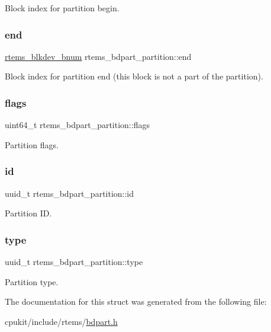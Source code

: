 Block index for partition begin. \mbox{\label{structrtems__bdpart__partition_ad30ffdd94a2d559e14aaf93b1a116ffd}} 
\subsubsection{\texorpdfstring{end}{end}}
{\footnotesize\ttfamily \mbox{\hyperlink{group__rtems__disk_ga5fbcfd40b657bff6c54d9e393fab3274}{rtems\+\_\+blkdev\+\_\+bnum}} rtems\+\_\+bdpart\+\_\+partition\+::end}

Block index for partition end (this block is not a part of the partition). \mbox{\label{structrtems__bdpart__partition_a820a70ab5b27cdc40496cd1df1346b83}} 
\subsubsection{\texorpdfstring{flags}{flags}}
{\footnotesize\ttfamily uint64\+\_\+t rtems\+\_\+bdpart\+\_\+partition\+::flags}

Partition flags. \mbox{\label{structrtems__bdpart__partition_ab05630a2edb3ac05876dc2c1845bed3b}} 
\subsubsection{\texorpdfstring{id}{id}}
{\footnotesize\ttfamily uuid\+\_\+t rtems\+\_\+bdpart\+\_\+partition\+::id}

Partition ID. \mbox{\label{structrtems__bdpart__partition_a6bba464cc39cbda2a2abcbff6839503c}} 
\subsubsection{\texorpdfstring{type}{type}}
{\footnotesize\ttfamily uuid\+\_\+t rtems\+\_\+bdpart\+\_\+partition\+::type}

Partition type. 

The documentation for this struct was generated from the following file\+:\begin{DoxyCompactItemize}
\item 
cpukit/include/rtems/\mbox{\hyperlink{bdpart_8h}{bdpart.\+h}}\end{DoxyCompactItemize}
